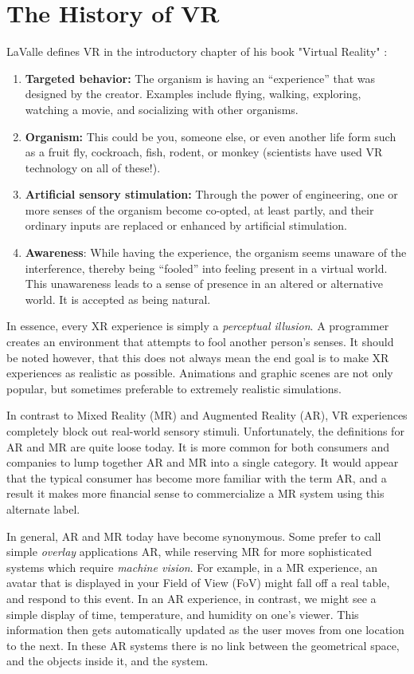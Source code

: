 \section{The History of VR}

LaValle defines VR in the introductory chapter of his book "Virtual Reality" \cite{lavalle2016virtual}: 

\begin{enumerate}
    \item \textbf{Targeted behavior:} The organism is having an “experience” that was designed by the creator. Examples include flying, walking, exploring, watching a movie, and socializing with other organisms.
    \item \textbf{Organism:} This could be you, someone else, or even another life form such as a fruit fly, cockroach, fish, rodent, or monkey (scientists have used VR technology on all of these!).
    \item \textbf{Artificial sensory stimulation:} Through the power of engineering, one or more senses of the organism become co-opted, at least partly, and their ordinary inputs are replaced or enhanced by artificial stimulation.
    \item \textbf{Awareness}: While having the experience, the organism seems unaware of the interference, thereby being “fooled” into feeling present in a virtual world. This unawareness leads to a sense of presence in an altered or alternative world. It is accepted as being natural.
\end{enumerate}

In essence, every XR experience is simply a \textit{perceptual illusion}. A programmer creates an environment that attempts to fool another person's senses. It should be noted however, that this does not always mean the end goal is to make XR experiences as realistic as possible. Animations and graphic scenes are not only popular, but sometimes preferable to extremely realistic simulations.

In contrast to Mixed Reality (MR) and Augmented Reality (AR), VR experiences completely block out real-world sensory stimuli. Unfortunately, the definitions for AR and MR are quite loose today. It is more common for both consumers and companies to lump together AR and MR into a single category. It would appear that the typical consumer has become more familiar with the term AR, and a result it makes more financial sense to commercialize a MR system using this alternate label.

In general, AR and MR today have become synonymous. Some prefer to call simple \textit{overlay} applications AR, while reserving MR for more sophisticated systems which require \textit{machine vision}. For example, in a MR experience, an avatar that is displayed in your Field of View (FoV) might fall off a real table, and respond to this event. In an AR experience, in contrast, we might see a simple display of time, temperature, and humidity on one's viewer. This information then gets automatically updated as the user moves from one location to the next. In these AR systems there is no link between the geometrical space, and the objects inside it, and the system. 

